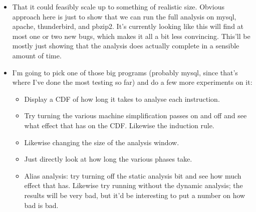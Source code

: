 \begin{itemize}
\item That it could feasibly scale up to something of realistic size.
  Obvious approach here is just to show that we can run the full
  analysis on mysql, apache, thunderbird, and pbzip2.  It's currently
  looking like this will find at most one or two new bugs, which makes
  it all a bit less convincing.  This'll be mostly just showing that
  the analysis does actually complete in a sensible amount of time.
\item I'm going to pick one of those big programs (probably mysql,
  since that's where I've done the most testing so far) and do a few
  more experiments on it:

  \begin{itemize}
  \item Display a CDF of how long it takes to analyse each instruction.
  \item Try turning the various machine simplification passes on and
    off and see what effect that has on the CDF.  Likewise the
    induction rule.
  \item Likewise changing the size of the analysis window.
  \item Just directly look at how long the various phases take.
  \item Alias analysis: try turning off the static analysis bit and
    see how much effect that has.  Likewise try running without the
    dynamic analysis; the results will be very bad, but it'd be
    interesting to put a number on how bad is bad.
  \end{itemize}


\end{itemize}
